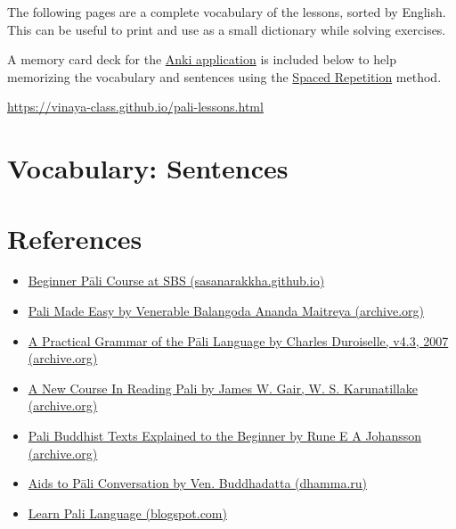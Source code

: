 \documentclass[11pt,oneside]{memoir}
\begin{document}
The following pages are a complete vocabulary of the lessons, sorted by English. This can be useful to print and use as a small dictionary while solving exercises.

A memory card deck for the \href{https://apps.ankiweb.net/}{Anki application} is included below to help memorizing the vocabulary and sentences using the \href{https://gwern.net/spaced-repetition}{Spaced Repetition} method.

\url{https://vinaya-class.github.io/pali-lessons.html}

\cleartonewsheet

\thispagestyle{empty}


\cleartonewsheet

\chapter{Vocabulary: Sentences}
\label{sec:orge9abfca}

\cleartonewsheet

\thispagestyle{empty}


\cleartonewsheet

\chapter{References}
\label{sec:org271ab74}

\begin{itemize}
\item \href{https://sasanarakkha.github.io/study-tools/pali-class.html}{Beginner Pāli Course at SBS (sasanarakkha.github.io)}
\item \href{https://archive.org/details/PaliMadeEasyOCRed}{Pali Made Easy by Venerable Balangoda Ananda Maitreya (archive.org)}
\item \href{https://archive.org/details/PaliGrammarCharlesDuroiselle}{A Practical Grammar of the Pāli Language by Charles Duroiselle, v4.3, 2007 (archive.org)}
\item \href{https://archive.org/details/NewPaliCourse/}{A New Course In Reading Pali by James W. Gair, W. S. Karunatillake (archive.org)}
\item \href{https://archive.org/details/PaliBuddhistTextsA}{Pali Buddhist Texts Explained to the Beginner by Rune E A Johansson (archive.org)}
\item \href{https://dhamma.ru/paali/aids\_to\_pali\_conversation.pdf}{Aids to Pāli Conversation by Ven. Buddhadatta (dhamma.ru)}
\item \href{https://palistudies.blogspot.com/}{Learn Pali Language (blogspot.com)}
\end{itemize}
\end{document}
